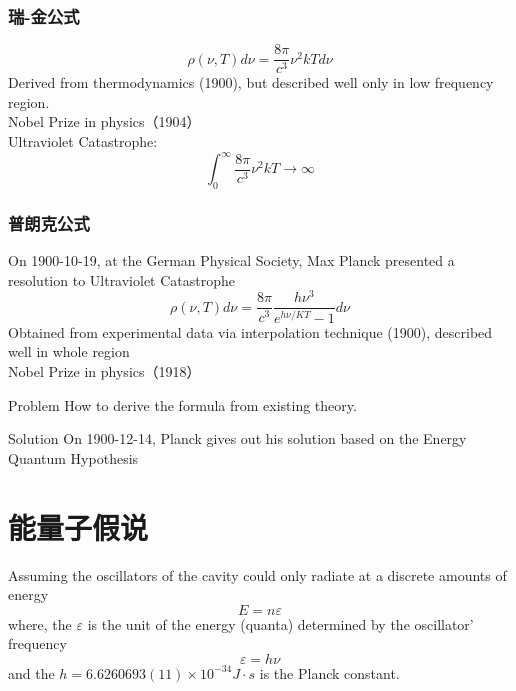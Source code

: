 \begin{frame}
    \frametitle{瑞-金公式}
    \begin{equation*}
        \rho(\nu, T) d \nu=\frac{8 \pi}{c^{3}} \nu^{2} k T d \nu 
    \end{equation*}
    Derived from thermodynamics (1900), but described well only in low frequency region.\\ 
   {\color{deepred} Nobel Prize in physics（1904）}\\
   {\color{deepblue} Ultraviolet Catastrophe:} 
    \begin{equation*}
         \int_0 ^\infty \frac{8 \pi}{c^{3}} \nu^{2} k T \to \infty 
    \end{equation*}
\end{frame}

\begin{frame}
    \frametitle{普朗克公式}
    On 1900-10-19, at the German Physical Society, 
    Max Planck presented a resolution to {\color{deepblue} Ultraviolet Catastrophe} 
    \begin{equation}
        \boxed{\rho(\nu, T) d \nu=\frac{8 \pi}{c^{3}} \frac{h \nu^{3}}{e^{h \nu / K T}-1} d \nu}
    \end{equation}
    Obtained from experimental data via interpolation technique (1900), described well in whole region \\
    {\color{deepred} Nobel Prize in physics（1918）}\\
\end{frame}

\begin{frame}
    \begin{block}{Problem}
        How to derive the formula from existing theory.
    \end{block}
    \begin{exampleblock}{Solution}
        On 1900-12-14, Planck gives out his solution based on the Energy Quantum Hypothesis  
    \end{exampleblock}
\end{frame}

\section{能量子假说}
\begin{frame}
    \begin{tcolorbox4}
    Assuming the oscillators of the cavity could only radiate at a discrete amounts of energy
    \begin{equation}
        E=n\varepsilon
    \end{equation}
    where, the $\varepsilon$ is the unit of the energy (quanta) determined by the oscillator' frequency 
    \begin{equation}
        \varepsilon=h\nu
    \end{equation}
    and the $h=6.6260693(11)\times10^{-34} J\cdot s $ is the Planck constant. 
    \end{tcolorbox4}
\end{frame}

